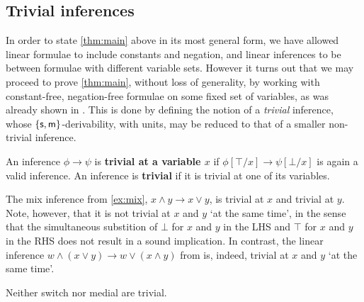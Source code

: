 \documentclass[a4paper, UKenglish, cleveref]{lipics-v2019}
\begin{document}
\subsection{Trivial inferences}
\label{sec:trivial}
In order to state \cref{thm:main} above in its most general form, we have allowed linear formulae to include constants and negation, and linear inferences to be between formulae with different variable sets.
However
it turns out that we may proceed to prove \cref{thm:main}, without loss of generality, by working with constant-free, negation-free formulae on some fixed set of variables, as was already shown in \cite{Das13:lin-inf-rew}. This is done by defining the notion of a \emph{trivial} inference, whose $\{\mathsf{s},\mathsf{m} \}$-derivability, with units, may be reduced to that of a smaller non-trivial inference.

\begin{definition}
  An inference \(\phi \to \psi\) is \textbf{trivial at a variable \(x\)} if \(\phi[\top/x] \to \psi[\bot/x]\) is again a valid inference.
  An inference is \textbf{trivial} if it is trivial at one of its variables.
\end{definition}


\begin{example}
  The mix inference from \cref{ex:mix}, \(x \land y \to x \lor y\), is trivial at \(x\) and trivial at \(y\).
  Note, however, that it is not trivial at $x$ and $y$ `at the same time', in the sense that the simultaneous substition of $\bot $ for $x$ and $y$ in the LHS and $\top$ for $x$ and $y$ in the RHS does not result in a sound implication.
	In contrast, the linear inference $w \land (x \lor y) \to w \lor (x \land y)$ from \cite{Das13:lin-inf-rew} is, indeed, trivial at $x$ and $y$ {`at the same time'}.

  Neither switch nor medial are trivial.
\end{example}


\end{document}
